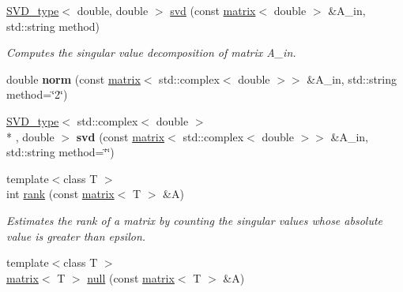 \begin{DoxyCompactItemize}
\item 
\hypertarget{namespacekeycpp_a838fc93d66e1ab63d68d04781086d81a}{\hyperlink{structkeycpp_1_1_s_v_d__type}{S\-V\-D\-\_\-type}$<$ double, double $>$ \hyperlink{namespacekeycpp_a838fc93d66e1ab63d68d04781086d81a}{svd} (const \hyperlink{classkeycpp_1_1matrix}{matrix}$<$ double $>$ \&A\-\_\-in, std\-::string method)}\label{namespacekeycpp_a838fc93d66e1ab63d68d04781086d81a}

\begin{DoxyCompactList}\small\item\em Computes the singular value decomposition of matrix A\-\_\-in. \end{DoxyCompactList}\item 
\hypertarget{namespacekeycpp_ad211ab5ae14ac9710265c662f70f20ff}{double {\bfseries norm} (const \hyperlink{classkeycpp_1_1matrix}{matrix}$<$ std\-::complex$<$ double $>$$>$ \&A\-\_\-in, std\-::string method=\char`\"{}2\char`\"{})}\label{namespacekeycpp_ad211ab5ae14ac9710265c662f70f20ff}

\item 
\hypertarget{namespacekeycpp_ab96149e6d3b76c5363601903c4fb72bb}{\hyperlink{structkeycpp_1_1_s_v_d__type}{S\-V\-D\-\_\-type}$<$ std\-::complex$<$ double $>$\\*
, double $>$ {\bfseries svd} (const \hyperlink{classkeycpp_1_1matrix}{matrix}$<$ std\-::complex$<$ double $>$$>$ \&A\-\_\-in, std\-::string method=\char`\"{}\char`\"{})}\label{namespacekeycpp_ab96149e6d3b76c5363601903c4fb72bb}

\item 
\hypertarget{namespacekeycpp_aeb9efbc77cc58fa22403ea7ae5f4555c}{{\footnotesize template$<$class T $>$ }\\int \hyperlink{namespacekeycpp_aeb9efbc77cc58fa22403ea7ae5f4555c}{rank} (const \hyperlink{classkeycpp_1_1matrix}{matrix}$<$ T $>$ \&A)}\label{namespacekeycpp_aeb9efbc77cc58fa22403ea7ae5f4555c}

\begin{DoxyCompactList}\small\item\em Estimates the rank of a matrix by counting the singular values whose absolute value is greater than epsilon. \end{DoxyCompactList}\item 
\hypertarget{namespacekeycpp_a8f497e2da901adba0e1257be943595a1}{{\footnotesize template$<$class T $>$ }\\\hyperlink{classkeycpp_1_1matrix}{matrix}$<$ T $>$ \hyperlink{namespacekeycpp_a8f497e2da901adba0e1257be943595a1}{null} (const \hyperlink{classkeycpp_1_1matrix}{matrix}$<$ T $>$ \&A)}\label{namespacekeycpp_a8f497e2da901adba0e1257be943595a1}


\end{DoxyCompactItemize}
